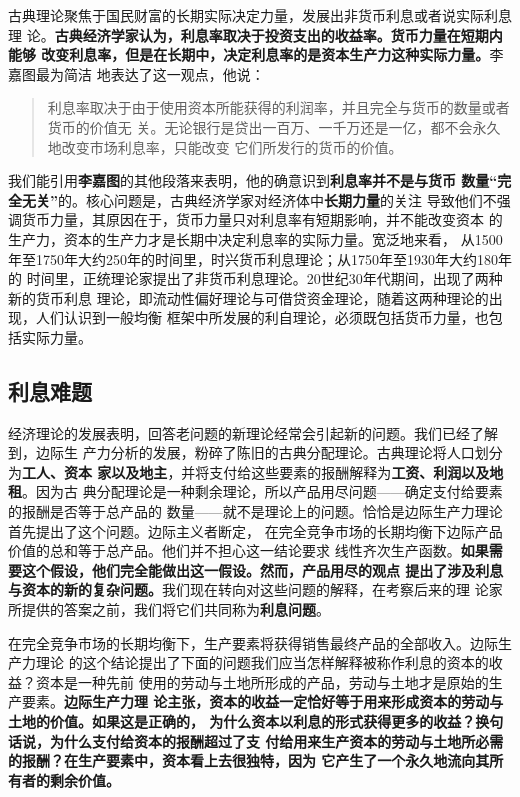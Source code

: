 古典理论聚焦于国民财富的长期实际决定力量，发展出非货币利息或者说实际利息理
论。\textbf{古典经济学家认为，利息率取决于投资支出的收益率。货币力量在短期内能够
  改变利息率，但是在长期中，决定利息率的是资本生产力这种实际力量。}李嘉图最为简洁
地表达了这一观点，他说：
\begin{quotation}
  利息率取决于由于使用资本所能获得的利润率，并且完全与货币的数量或者货币的价值无
  关。无论银行是贷出一百万、一千万还是一亿，都不会永久地改变市场利息率，只能改变
  它们所发行的货币的价值。
\end{quotation}

我们能引用\textbf{李嘉图}的其他段落来表明，他的确意识到\textbf{利息率并不是与货币
  数量“完全无关”}的。核心问题是，古典经济学家对经济体中\textbf{长期力量}的关注
导致他们不强调货币力量，其原因在于，货币力量只对利息率有短期影响，并不能改变资本
的生产力，资本的生产力才是长期中决定利息率的实际力量。宽泛地来看，
从1500年至1750年大约250年的时间里，时兴货币利息理论；从1750年至1930年大约180年的
时间里，正统理论家提出了非货币利息理论。20世纪30年代期间，出现了两种新的货币利息
理论，即流动性偏好理论与可借贷资金理论，随着这两种理论的出现，人们认识到一般均衡
框架中所发展的利自理论，必须既包括货币力量，也包括实际力量。

\subsection{利息难题}

经济理论的发展表明，回答老问题的新理论经常会引起新的问题。我们已经了解到，边际生
产力分析的发展，粉碎了陈旧的古典分配理论。古典理论将人口划分为\textbf{工人、资本
  家以及地主}，并将支付给这些要素的报酬解释为\textbf{工资、利润以及地租}。因为古
典分配理论是一种剩余理论，所以产品用尽问题——确定支付给要素的报酬是否等于总产品的
数量——就不是理论上的问题。恰恰是边际生产力理论首先提出了这个问题。边际主义者断定，
在完全竞争市场的长期均衡下边际产品价值的总和等于总产品。他们并不担心这一结论要求
线性齐次生产函数。\textbf{如果需要这个假设，他们完全能做出这一假设。然而，产品用尽的观点
提出了涉及利息与资本的新的复杂问题。}我们现在转向对这些问题的解释，在考察后来的理
论家所提供的答案之前，我们将它们共同称为\textbf{利息问题}。

在完全竞争市场的长期均衡下，生产要素将获得销售最终产品的全部收入。边际生产力理论
的这个结论提出了下面的问题我们应当怎样解释被称作利息的资本的收益？资本是一种先前
使用的劳动与土地所形成的产品，劳动与土地才是原始的生产要素。\textbf{边际生产力理
  论主张，资本的收益一定恰好等于用来形成资本的劳动与土地的价值。如果这是正确的，
  为什么资本以利息的形式获得更多的收益？换句话说，为什么支付给资本的报酬超过了支
  付给用来生产资本的劳动与土地所必需的报酬？在生产要素中，资本看上去很独特，因为
  它产生了一个永久地流向其所有者的剩余价值。}

